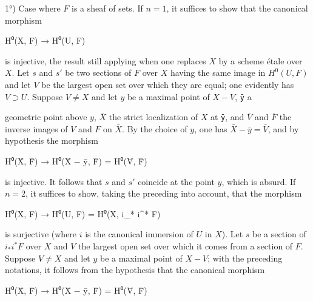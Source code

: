 \documentclass[
]{article}
\newenvironment{Shaded}{}{}
\newcommand{\NormalTok}[1]{#1}
\begin{document}
1°) Case where \(F\) is a sheaf of sets. If \(n = 1\), it suffices to
show that the canonical morphism

\begin{Shaded}
\begin{Highlighting}[]
\NormalTok{H⁰(X, F) → H⁰(U, F)}
\end{Highlighting}
\end{Shaded}

is injective, the result still applying when one replaces \(X\) by a
scheme étale over \(X\). Let \(s\) and \(s'\) be two sections of \(F\)
over \(X\) having the same image in \(H^{0}(U, F)\) and let \(V\) be the
largest open set over which they are equal; one evidently has
\(V \supset U\). Suppose \(V \neq X\) and let \(y\) be a maximal point
of \(X - V\), \texttt{ȳ} a

geometric point above \(y\), \(\bar{X}\) the strict localization of
\(X\) at \texttt{ȳ}, and \(\bar{V}\) and \(\bar{F}\) the inverse images
of \(V\) and \(F\) on \(\bar{X}\). By the choice of \(y\), one has
\(\bar{X} - \bar{y} = \bar{V}\), and by hypothesis the morphism

\begin{Shaded}
\begin{Highlighting}[]
\NormalTok{H⁰(X̄, F̄) → H⁰(X̄ − ȳ, F̄) = H⁰(V̄, F̄)}
\end{Highlighting}
\end{Shaded}

is injective. It follows that \(s\) and \(s'\) coincide at the point
\(y\), which is absurd. If \(n = 2\), it suffices to show, taking the
preceding into account, that the morphism

\begin{Shaded}
\begin{Highlighting}[]
\NormalTok{H⁰(X, F) → H⁰(U, F) = H⁰(X, i\_* i\^{}* F)}
\end{Highlighting}
\end{Shaded}

is surjective (where \(i\) is the canonical immersion of \(U\) in
\(X\)). Let \(s\) be a section of \(i_{*} i^{*} F\) over \(X\) and \(V\)
the largest open set over which it comes from a section of \(F\).
Suppose \(V \neq X\) and let \(y\) be a maximal point of \(X - V\); with
the preceding notations, it follows from the hypothesis that the
canonical morphism

\begin{Shaded}
\begin{Highlighting}[]
\NormalTok{H⁰(X̄, F̄) → H⁰(X̄ − ȳ, F̄) = H⁰(V̄, F̄)}
\end{Highlighting}
\end{Shaded}
\end{document}
